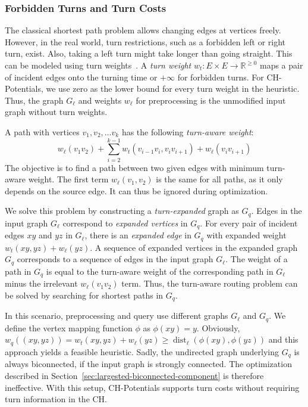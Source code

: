 \documentclass[manuscript,review]{acmart}
\newcommand*{\dist}{\operatorname{dist}}
\begin{document}
\subsubsection{Forbidden Turns and Turn Costs}
\label{sec:no-turns}

The classical shortest path problem allows changing edges at vertices freely.
However, in the real world, turn restrictions, such as a forbidden left or right turn, exist.
Also, taking a left turn might take longer than going straight.
This can be modeled using turn weights~\cite{gv-errnt-11,dgpw-crprn-13,bwzz-cchtc-20}.
A \emph{turn weight} $w_t : E \times E \to \mathbb{R}^{\geq 0}$ maps a pair of incident edges onto the turning time or $+\infty$ for forbidden turns.
For CH-Potentials, we use zero as the lower bound for every turn weight in the heuristic.
Thus, the graph $G_\ell$ and weights $w_\ell$ for preprocessing is the unmodified input graph without turn weights.

A path with vertices $v_1, v_2,\ldots v_k$ has the following \emph{turn-aware weight}: \[
w_\ell(v_1 v_2) + \sum_{i=2}^{k-1}  w_t(v_{i-1} v_i, v_i v_{i+1}) + w_\ell(v_i v_{i+1})
\]
The objective is to find a path between two given edges with minimum turn-aware weight.
The first term $w_\ell(v_1, v_2)$ is the same for all paths, as it only depends on the source edge.
It can thus be ignored during optimization.

We solve this problem by constructing a \emph{turn-expanded} graph as $G_q$.
Edges in the input graph $G_\ell$ correspond to \emph{expanded vertices} in $G_q$.
For every pair of incident edges $x y$ and $y z$ in $G_\ell$, there is an \emph{expanded edge} in $G_q$ with expanded weight $w_t(xy,yz) + w_\ell(y z)$.
A sequence of expanded vertices in the expanded graph $G_q$ corresponds to a sequence of edges in the input graph $G_\ell$.
The weight of a path in $G_q$ is equal to the turn-aware weight of the corresponding path in $G_\ell$ minus the irrelevant $w_\ell(v_1 v_2)$ term.
Thus, the turn-aware routing problem can be solved by searching for shortest paths in $G_q$.

In this scenario, preprocessing and query use different graphs $G_\ell$ and $G_q$.
We define the vertex mapping function $\phi$ as $\phi(x y) = y$.
Obviously, $w_q((xy, yz)) = w_t(xy,yz) + w_\ell(y z) \geq \dist_\ell(\phi(x y), \phi(y z))$ and this approach yields a feasible heuristic.
Sadly, the undirected graph underlying $G_q$ is always biconnected, if the input graph is strongly connected.
The optimization described in Section~\ref{sec:largested-biconnected-component} is therefore ineffective.
With this setup, CH-Potentials supports turn costs without requiring turn information in the CH.
\end{document}
